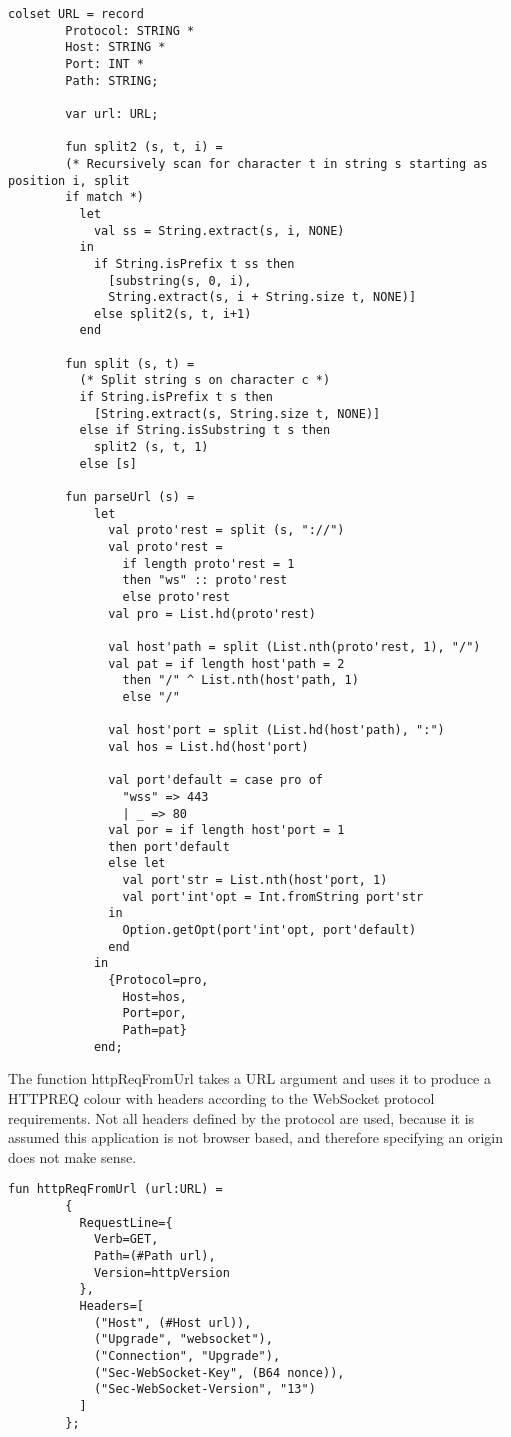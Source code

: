 		\begin{lstlisting}[label=lst:url,caption=URL Declarations,gobble=2]
		colset URL = record
		Protocol: STRING *
		Host: STRING *
		Port: INT *
		Path: STRING;
		
		var url: URL;
		
		fun split2 (s, t, i) =
		(* Recursively scan for character t in string s starting as position i, split
		if match *)
		  let
		    val ss = String.extract(s, i, NONE) 
		  in 
		    if String.isPrefix t ss then
		      [substring(s, 0, i), 
		      String.extract(s, i + String.size t, NONE)]
		    else split2(s, t, i+1)
		  end
		
		fun split (s, t) = 
		  (* Split string s on character c *)
		  if String.isPrefix t s then
		    [String.extract(s, String.size t, NONE)]
		  else if String.isSubstring t s then
		    split2 (s, t, 1)
		  else [s]
		
		fun parseUrl (s) = 
			let
			  val proto'rest = split (s, "://")
			  val proto'rest = 
			    if length proto'rest = 1 
			    then "ws" :: proto'rest 
			    else proto'rest 
			  val pro = List.hd(proto'rest)
			
			  val host'path = split (List.nth(proto'rest, 1), "/")
			  val pat = if length host'path = 2
			    then "/" ^ List.nth(host'path, 1)
			    else "/"
			  
			  val host'port = split (List.hd(host'path), ":")
			  val hos = List.hd(host'port)
			
			  val port'default = case pro of
			    "wss" => 443
			    | _ => 80
			  val por = if length host'port = 1 
			  then port'default
			  else let
			    val port'str = List.nth(host'port, 1)
			    val port'int'opt = Int.fromString port'str
			  in
			    Option.getOpt(port'int'opt, port'default)
			  end
			in
			  {Protocol=pro, 
			    Host=hos, 
			    Port=por, 
			    Path=pat}
			end;
		\end{lstlisting}
		
		The function httpReqFromUrl takes a URL argument and uses it to produce a
		HTTPREQ colour with headers according to the WebSocket protocol requirements.
		Not all headers defined by the protocol are used, because it is assumed this
		application is not browser based, and therefore specifying an origin does not
		make sense.
		
		\begin{lstlisting}[label=lst:httpReqFromUrl,caption=httpReqFromUrl,gobble=2]
		fun httpReqFromUrl (url:URL) = 
		{
		  RequestLine={
		    Verb=GET, 
		    Path=(#Path url),
		    Version=httpVersion
		  },
		  Headers=[
		    ("Host", (#Host url)),
		    ("Upgrade", "websocket"),
		    ("Connection", "Upgrade"),
		    ("Sec-WebSocket-Key", (B64 nonce)),
		    ("Sec-WebSocket-Version", "13")
		  ]
		};
		\end{lstlisting}
		
